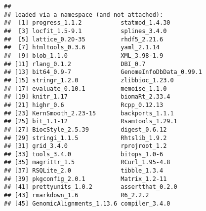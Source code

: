 \documentclass{report}\usepackage[]{graphicx}\usepackage[usenames,dvipsnames]{color}
\newenvironment{knitrout}{}{} %
\begin{document}
\begin{knitrout}
\begin{kframe}
\begin{verbatim}
## 
## loaded via a namespace (and not attached):
##  [1] progress_1.1.2           statmod_1.4.30          
##  [3] locfit_1.5-9.1           splines_3.4.0           
##  [5] lattice_0.20-35          rhdf5_2.21.6            
##  [7] htmltools_0.3.6          yaml_2.1.14             
##  [9] blob_1.1.0               XML_3.98-1.9            
## [11] rlang_0.1.2              DBI_0.7                 
## [13] bit64_0.9-7              GenomeInfoDbData_0.99.1 
## [15] stringr_1.2.0            zlibbioc_1.23.0         
## [17] evaluate_0.10.1          memoise_1.1.0           
## [19] knitr_1.17               biomaRt_2.33.4          
## [21] highr_0.6                Rcpp_0.12.13            
## [23] KernSmooth_2.23-15       backports_1.1.1         
## [25] bit_1.1-12               Rsamtools_1.29.1        
## [27] BiocStyle_2.5.39         digest_0.6.12           
## [29] stringi_1.1.5            Rhtslib_1.9.2           
## [31] grid_3.4.0               rprojroot_1.2           
## [33] tools_3.4.0              bitops_1.0-6            
## [35] magrittr_1.5             RCurl_1.95-4.8          
## [37] RSQLite_2.0              tibble_1.3.4            
## [39] pkgconfig_2.0.1          Matrix_1.2-11           
## [41] prettyunits_1.0.2        assertthat_0.2.0        
## [43] rmarkdown_1.6            R6_2.2.2                
## [45] GenomicAlignments_1.13.6 compiler_3.4.0
\end{verbatim}
\end{kframe}
\end{knitrout}


\end{document}
